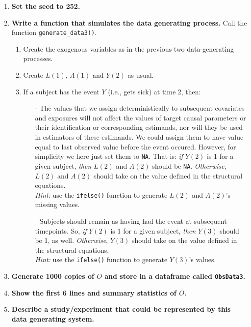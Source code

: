 \documentclass[answers]{exam}
\begin{document}
\begin{enumerate}
\item \textbf{Set the seed to 252.}
\item \textbf{Write a function that simulates the data generating process.} Call the function \texttt{generate\_data3()}.
\begin{enumerate}
\item Create the exogenous variables as in the previous two data-generating processes.
\item Create $L(1)$, $A(1)$ and $Y(2)$ as usual.
\item If a subject has the event $Y$ (i.e., gets sick) at time 2, then:
\begin{itemize}
\item[-] The values that we assign deterministically to subsequent covariates and exposures  will not affect the values of target causal parameters or their identification or corresponding estimands, nor will they be used in estimators of these estimands. We could assign them to have value equal to last observed value before the event occured. However, for simplicity we here just set them to \texttt{NA}. That is: \textit{if} $Y(2)$ is 1 for a given subject,  \textit{then} $L(2)$ and $A(2)$ should be \texttt{NA}. \textit{Otherwise}, $L(2)$ and $A(2)$ should take on the value defined in the structural equations.\\
\emph{Hint:} use the \texttt{ifelse()} function to generate $L(2)$ and $A(2)$'s missing values.
\item[-] Subjects should remain as having had the event at subsequent timepoints. So, \textit{if} $Y(2)$ is 1 for a given subject, \textit{then} $Y(3)$ should be 1, as well. \textit{Otherwise}, $Y(3)$ should take on the value defined in the structural equations. \\
\emph{Hint:} use the \texttt{ifelse()} function to generate $Y(3)$'s values.
\end{itemize}
\end{enumerate}
\item \textbf{Generate 1000 copies of $O$ and store in a dataframe called \texttt{ObsData3}.}
\item \textbf{Show the first 6 lines and summary statistics of $O$.}
\item \textbf{Describe a study/experiment that could be represented by this data generating system.}
\end{enumerate}
\end{document}

